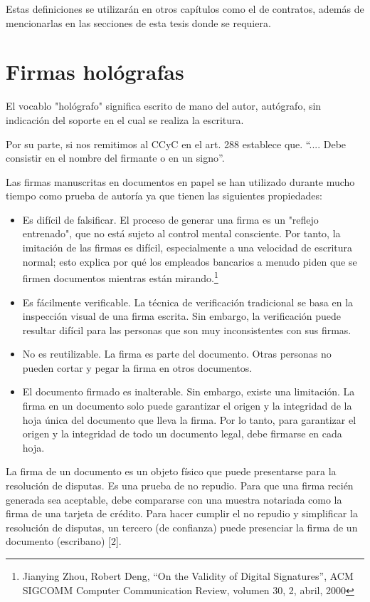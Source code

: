 \documentclass[12pt]{report} %
\begin{document}
Estas definiciones se utilizarán en otros capítulos como el de contratos, además de mencionarlas en las secciones de esta tesis donde se requiera.

\section{Firmas hológrafas}

El vocablo "hológrafo" significa escrito de mano del autor, autógrafo, sin indicación del soporte en el cual se realiza la escritura.

Por su parte, si nos remitimos al CCyC en el art. 288 establece que. “.... Debe consistir en el nombre del firmante o en un signo”. 

Las firmas manuscritas en documentos en papel se han utilizado durante mucho tiempo como prueba de autoría ya que tienen las siguientes propiedades:

\begin{itemize}
    \item Es difícil de falsificar. El proceso de generar una firma es un "reflejo entrenado", que no está sujeto al control mental consciente. Por tanto, la imitación de las firmas es difícil, especialmente a una velocidad de escritura normal; esto explica por qué los empleados bancarios a menudo piden que se firmen documentos mientras están mirando.\footnote{Jianying Zhou, Robert Deng, “On the Validity of Digital Signatures”, ACM SIGCOMM Computer Communication Review, volumen 30, 2, abril, 2000} 
    \item Es fácilmente verificable. La técnica de verificación tradicional se basa en la inspección visual de una firma escrita. Sin embargo, la verificación puede resultar difícil para las personas que son muy inconsistentes con sus firmas.
    \item No es reutilizable. La firma es parte del documento. Otras personas no pueden cortar y pegar la firma en otros documentos.
    \item El documento firmado es inalterable. Sin embargo, existe una limitación. La firma en un documento solo puede garantizar el origen y la integridad de la hoja única del documento que lleva la firma. Por lo tanto, para garantizar el origen y la integridad de todo un documento legal, debe firmarse en cada hoja. 

\end{itemize}

La firma de un documento es un objeto físico que puede presentarse para la resolución de disputas. Es una prueba de no repudio. Para que una firma recién generada sea aceptable, debe compararse con una muestra notariada como la firma de una tarjeta de crédito. Para hacer cumplir el no repudio y simplificar la resolución de disputas, un tercero (de confianza) puede presenciar la firma de un documento (escribano) [2].
\end{document}
